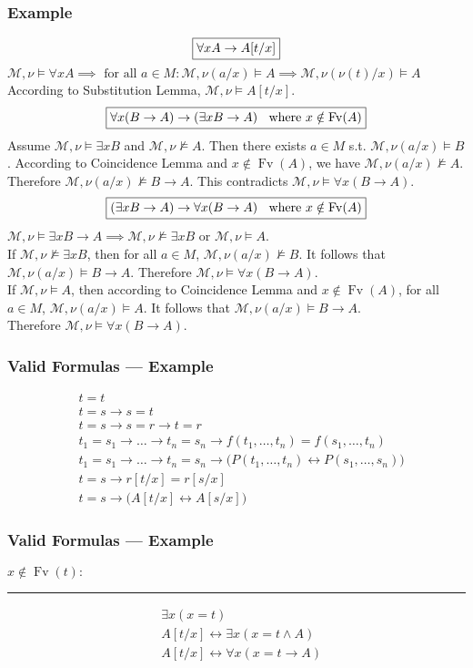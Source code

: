 \documentclass[UTF8,aspectratio=43,11pt,colorlinks,compress,openany]{beamer}%
\begin{document}
\begin{frame}\frametitle{Example}\vspace*{-2ex}
\[\fbox{$\forall x A\to A[t/x]$}\]
$\mathcal{M},\nu\vDash\forall x A\implies\mbox{ for all } a\in M: \mathcal{M},\nu(a/x)\vDash A\implies\mathcal{M},\nu(\nu(t)/x)\vDash A$\\
According to Substitution Lemma, $\mathcal{M},\nu\vDash A[t/x]$.
\[\fbox{$\forall x(B\to A)\to(\exists x B\to A)\;\; \mbox{ where } x\notin\operatorname{Fv}(A)$}\]
Assume $\mathcal{M},\nu\vDash\exists x B$ and $\mathcal{M},\nu\nvDash A$. Then there exists $a\in M$ s.t. $\mathcal{M},\nu(a/x)\vDash B$. According to Coincidence Lemma and $x\notin\operatorname{Fv}(A)$, we have $\mathcal{M},\nu(a/x)\nvDash A$. Therefore $\mathcal{M},\nu(a/x)\nvDash B\to A$. This contradicts $\mathcal{M},\nu\vDash\forall x(B\to A)$.
\[\fbox{$(\exists x B\to A)\to\forall x(B\to A)\;\; \mbox{ where } x\notin\operatorname{Fv}(A)$}\]
$\mathcal{M},\nu\vDash\exists x B\to A\implies\mathcal{M},\nu\nvDash\exists x B\mbox{ or }\mathcal{M},\nu\vDash A$.\\
If $\mathcal{M},\nu\nvDash\exists x B$, then for all $a\in M$, $\mathcal{M},\nu(a/x)\nvDash B$. It follows that $\mathcal{M},\nu(a/x)\vDash B\to A$. Therefore $\mathcal{M},\nu\vDash\forall x(B\to A)$.\\
If $\mathcal{M},\nu\vDash A$, then according to Coincidence Lemma and $x\notin\operatorname{Fv}(A)$, for all $a\in M$, $\mathcal{M},\nu(a/x)\vDash A$. It follows that $\mathcal{M},\nu(a/x)\vDash B\to A$.\\
Therefore $\mathcal{M},\nu\vDash\forall x(B\to A)$.
\end{frame}

\begin{frame}\frametitle{Valid Formulas --- Example}
	\begin{align*}
	&t=t\\
	&t=s\to s=t\\
	&t=s\to s=r\to t=r\\
	&t_1=s_1\to\dots\to t_n=s_n\to f(t_1,\dots,t_n)=f(s_1,\dots,t_n)\\
	&t_1=s_1\to\dots\to t_n=s_n\to \bigl(P(t_1,\dots,t_n)\leftrightarrow P(s_1,\dots,s_n)\bigr)\\
	&t=s\to r[t/x]=r[s/x]\\
	&t=s\to\bigl(A[t/x]\leftrightarrow A[s/x]\bigr)
	\end{align*}
\end{frame}

\begin{frame}\frametitle{Valid Formulas --- Example}
	$x\notin \operatorname{Fv}(t):$
	\hrule
	\begin{align*}
	&\exists x(x=t)\\
	& A[t/x]\leftrightarrow\exists x (x=t\wedge A)\\
	& A[t/x]\leftrightarrow\forall x(x=t\to A)
	\end{align*}
\end{frame}
\end{document}
